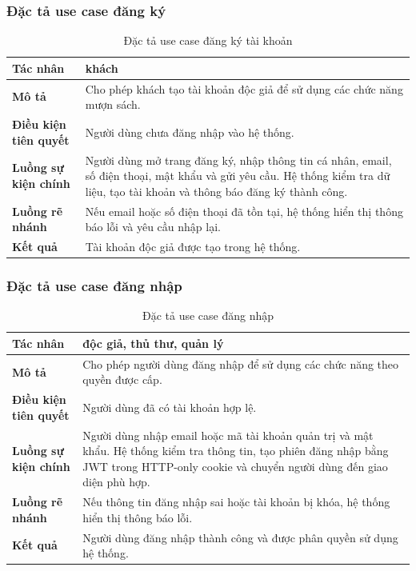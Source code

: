 \documentclass[../main.tex]{subfiles}
\begin{document}
\subsubsection{Đặc tả use case đăng ký}

\begin{table}[H]
\centering
\caption{Đặc tả use case đăng ký tài khoản}
\begin{tabularx}{\textwidth}{|p{4cm}|X|}
\hline
\textbf{Tác nhân} & khách \\
\hline
\textbf{Mô tả} & Cho phép khách tạo tài khoản độc giả để sử dụng các chức năng mượn sách. \\
\hline
\textbf{Điều kiện tiên quyết} & Người dùng chưa đăng nhập vào hệ thống. \\
\hline
\textbf{Luồng sự kiện chính} & Người dùng mở trang đăng ký, nhập thông tin cá nhân, email, số điện thoại, mật khẩu và gửi yêu cầu. Hệ thống kiểm tra dữ liệu, tạo tài khoản và thông báo đăng ký thành công. \\
\hline
\textbf{Luồng rẽ nhánh} & Nếu email hoặc số điện thoại đã tồn tại, hệ thống hiển thị thông báo lỗi và yêu cầu nhập lại. \\
\hline
\textbf{Kết quả} & Tài khoản độc giả được tạo trong hệ thống. \\
\hline
\end{tabularx}
\end{table}

\subsubsection{Đặc tả use case đăng nhập}

\begin{table}[H]
\centering
\caption{Đặc tả use case đăng nhập}
\begin{tabularx}{\textwidth}{|p{4cm}|X|}
\hline
\textbf{Tác nhân} & độc giả, thủ thư, quản lý \\
\hline
\textbf{Mô tả} & Cho phép người dùng đăng nhập để sử dụng các chức năng theo quyền được cấp. \\
\hline
\textbf{Điều kiện tiên quyết} & Người dùng đã có tài khoản hợp lệ. \\
\hline
\textbf{Luồng sự kiện chính} & Người dùng nhập email hoặc mã tài khoản quản trị và mật khẩu. Hệ thống kiểm tra thông tin, tạo phiên đăng nhập bằng JWT trong HTTP-only cookie và chuyển người dùng đến giao diện phù hợp. \\
\hline
\textbf{Luồng rẽ nhánh} & Nếu thông tin đăng nhập sai hoặc tài khoản bị khóa, hệ thống hiển thị thông báo lỗi. \\
\hline
\textbf{Kết quả} & Người dùng đăng nhập thành công và được phân quyền sử dụng hệ thống. \\
\hline
\end{tabularx}
\end{table}
\end{document}
